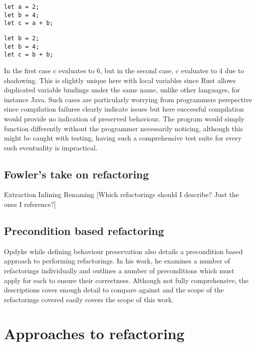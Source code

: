 \begin{verbatim}
let a = 2;
let b = 4;
let c = a + b;
\end{verbatim}

\begin{verbatim}
let b = 2;
let b = 4;
let c = b + b;
\end{verbatim}

In the first case c evaluates to 6, but in the second case, c evaluates to 4 due to shadowing. This is slightly unique here with local variables since Rust allows duplicated variable bindings under the same name, unlike other languages, for instance Java. Such cases are particularly worrying from programmers perspective since compilation failures clearly indicate issues but here successful compilation would provide no indication of preserved behaviour. The program would simply function differently without the programmer necessarily noticing, although this might be caught with testing, having such a comprehensive test suite for every such eventuality is impractical.


\subsection{Fowler's take on refactoring}
Extraction
Inlining
Renaming
[Which refactorings should I describe? Just the ones I reference?]

\subsection{Precondition based refactoring}
Opdyke while defining behaviour preservation also details a precondition based approach to performing refactorings. In his work, he examines a number of refactorings individually and outlines a number of preconditions which must apply for each to ensure their correctness. Although not fully comprehensive, the descriptions cover enough detail to compare against and the scope of the refactorings covered easily covers the scope of this work.



\section{Approaches to refactoring}\label{S:exback}
